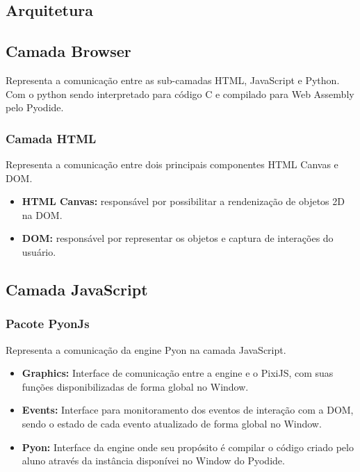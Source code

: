 \begin{apendicesenv}
\section{Arquitetura}

\subsection{Camada Browser}

Representa a comunicação entre as sub-camadas HTML, JavaScript e Python. Com o python sendo interpretado para código C e compilado para Web Assembly pelo Pyodide.

\subsubsection{Camada HTML}

Representa a comunicação entre dois principais componentes HTML Canvas e DOM. 

\begin{itemize}
    \item \textbf{HTML Canvas:} responsável por possibilitar a rendenização de objetos 2D na DOM. 
    \item \textbf{DOM:} responsável por representar os objetos e captura de interações do usuário.
\end{itemize}

\subsection{Camada JavaScript}

\subsubsection{Pacote PyonJs}

Representa a comunicação da engine Pyon na camada JavaScript.

\begin{itemize}
    \item \textbf{Graphics:} Interface de comunicação entre a engine e o PixiJS, com suas funções disponibilizadas de forma global no Window.
    \item \textbf{Events:} Interface para monitoramento dos eventos de interação com a DOM, sendo o estado de cada evento atualizado de forma global no Window.
    \item \textbf{Pyon:} Interface da engine onde seu propósito é compilar o código criado pelo aluno através da instância disponívei no Window do Pyodide.
\end{itemize}


\end{apendicesenv}
